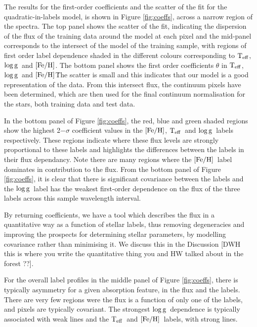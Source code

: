 \documentclass[12pt, preprint]{aastex}
\newcommand{\teff}{\mbox{$\rm T_{eff}$}}
\newcommand{\feh}{\mbox{$\rm [Fe/H]$}}
\newcommand{\logg}{\mbox{$\rm \log g$}}
\begin{document}
The results for the first-order coefficients and the scatter of the fit for the quadratic-in-labels model, is shown in Figure \ref{fig:coeffs}, across a narrow region of the spectra. The top panel shows the scatter of the fit, indicating the dispersion of the flux of the training data around the model at each pixel and the mid-panel corresponds to the intersect of the model of the training sample, with regions of first order label dependence shaded in the different colours corresponding to \teff, \logg\ and \feh. The bottom panel shows the first order coefficients $\theta$ in \teff, \logg\ and \feh\.  The scatter is small and this indicates that our model is a good representation of the data. From this intersect flux, the continuum pixels have been determined, which  are then used for the final continuum normalisation for the stars, both training data and test data. 

 In the bottom panel of Figure \ref{fig:coeffs}, the red, blue and green shaded regions show the highest 2$-\sigma$ coefficient values in the \feh, \teff\ and \logg\ labels respectively. These regions indicate where these flux levels are strongly proportional to these labels and highlights the differences between the labels in their flux dependancy. Note there are many regions where the \feh\ label dominates in contribution to the flux. From the bottom panel of Figure \ref{fig:coeffs}, it is clear that there is significant covariance between the labels and the \logg\ label has the weakest first-order dependence on the flux of the three labels across this sample wavelength interval. 

By returning coefficients, we have a tool which describes the flux in a quantitative way as a function of stellar labels, thus removing degeneracies and improving the prospects for determining stellar parameters, by modelling covariance rather than minimising it. We discuss this in the Discussion [DWH this is where you write the quantitative thing you and HW talked about in the forest ??].

For the overall label profiles in the middle panel of Figure \ref{fig:coeffs}, there is typically asymmetry for a given absorption feature, in the flux and the labels. There are very few regions were the flux is a function of only one of the labels, and pixels are typically covariant. The strongest \logg\ dependence is typically associated with weak lines and the \teff\ and \feh\ labels, with strong lines. 
\end{document}
